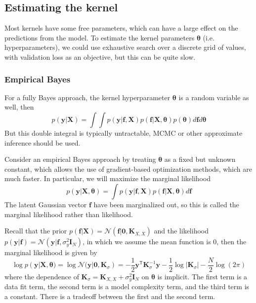 \documentclass[11pt]{article}
\begin{document}
\subsection{Estimating the kernel}
Most kernels have some free parameters, which can have a large effect on the predictions from the model.
To estimate the kernel parameters $\boldsymbol{\theta}$ (i.e. hyperparameters), we could use exhaustive search over a discrete grid of values,
with validation loss as an objective, but this can be quite slow.

\subsubsection*{Empirical Bayes}
For a fully Bayes approach, the kernel hyperparameter $\boldsymbol{\theta}$ is a random variable as well, then
\[
p(\boldsymbol{y}|\boldsymbol{X}) = \int \int p(\boldsymbol{y}|\boldsymbol{f}, \boldsymbol{X}) p(\boldsymbol{f}|\boldsymbol{X}, \boldsymbol{\theta})p(\boldsymbol{\theta}) d\boldsymbol{f} d\boldsymbol{\theta}
\]
But this double integral is typically untractable, MCMC or other approximate inference should be used.

Consider an empirical Bayes approach by treating $\boldsymbol{\theta}$ as a fixed but unknown constant, which allows the use of gradient-based optimization methods, which are much faster. In particular, we will maximize the marginal likelihood
\[
p(\boldsymbol{y}|\boldsymbol{X}, \boldsymbol{\theta}) = \int p(\boldsymbol{y}|\boldsymbol{f}, \boldsymbol{X}) p(\boldsymbol{f}|\boldsymbol{X}, \boldsymbol{\theta}) d\boldsymbol{f}
\]
The latent Gaussian vector $\boldsymbol{f}$ have been marginalized out, so this is called the marginal likelihood rather than likelihood.

Recall that the prior $p(\boldsymbol{f} | \boldsymbol{X}) = \mathcal{N}(\boldsymbol{f} | \boldsymbol{0}, \boldsymbol{K}_{X,X})$ and the likelihood $p(\boldsymbol{y} | \boldsymbol{f}) = \mathcal{N}(\boldsymbol{y} | \boldsymbol{f}, \sigma_y^2 \mathbf{I}_N)$, in which we assume the mean function is 0, then the marginal likelihood is given by
\[
\log p(\boldsymbol{y} | \mathbf{X}, \boldsymbol{\theta}) = \log \mathcal{N}(\boldsymbol{y} | \boldsymbol{0}, \mathbf{K}_\sigma) = -\frac{1}{2} \boldsymbol{y}^\mathsf{T} \mathbf{K}_\sigma^{-1} \boldsymbol{y} - \frac{1}{2} \log |\mathbf{K}_\sigma| - \frac{N}{2} \log(2\pi)
\]
where the dependence of $\mathbf{K}_\sigma = \mathbf{K}_{X,X} + \sigma_y^2 \mathbf{I}_N$ on $\boldsymbol{\theta}$ is implicit.
The first term is a data fit term, the second term is a model complexity term, and the third term is a constant.
There is a tradeoff between the first and the second term.
\end{document}
